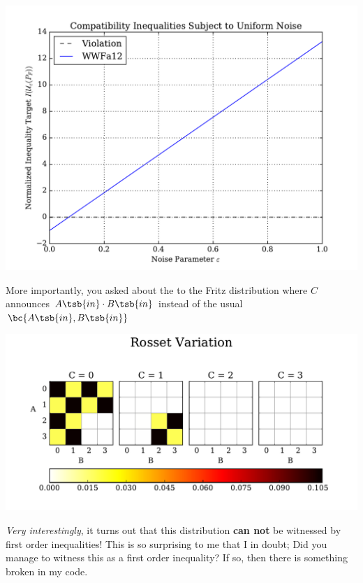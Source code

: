\documentclass[12pt]{article}
\begin{document}
    \begin{center}
        \includegraphics[width=\linewidth]{../../figures/noise/wagon_wheel_12.pdf}
    \end{center}

    More importantly, you asked about the  to the Fritz distribution where $C$ announces $A\tsb{in} \cdot B\tsb{in}$ instead of the usual $\bc{A\tsb{in},B\tsb{in}}$

    \begin{center}
        \includegraphics[width=\linewidth]{../../figures/distributions/rosset_variation_plotted.pdf}
    \end{center}

    \textit{Very interestingly}, it turns out that this distribution \textbf{can not} be witnessed by first order inequalities! This is so surprising to me that I in doubt; Did you manage to witness this as a first order inequality? If so, then there is something broken in my code.\\
\end{document}
